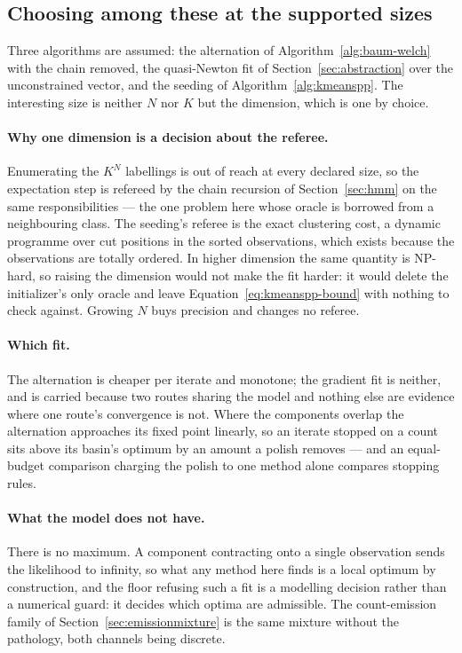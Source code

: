 \documentclass[11pt,a4paper]{article}
\begin{document}
\subsection{Choosing among these at the supported sizes}
\label{sec:mixture:discussion}
Three algorithms are assumed: the alternation of
Algorithm~\ref{alg:baum-welch} with the chain removed, the quasi-Newton fit of
Section~\ref{sec:abstraction} over the unconstrained vector, and the seeding of
Algorithm~\ref{alg:kmeanspp}. The interesting size is neither $N$ nor $K$ but
the dimension, which is one by choice.

\paragraph{Why one dimension is a decision about the referee.}
Enumerating the $K^N$ labellings is out of reach at every declared size, so the
expectation step is refereed by the chain recursion of Section~\ref{sec:hmm} on
the same responsibilities --- the one problem here whose oracle is borrowed
from a neighbouring class. The seeding's referee is the exact clustering cost,
a dynamic programme over cut positions in the sorted observations, which exists
because the observations are totally ordered. In higher dimension the same
quantity is NP-hard, so raising the dimension would not make the fit harder: it
would delete the initializer's only oracle and leave
Equation~\ref{eq:kmeanspp-bound} with nothing to check against. Growing $N$
buys precision and changes no referee.

\paragraph{Which fit.}
The alternation is cheaper per iterate and monotone; the gradient fit is
neither, and is carried because two routes sharing the model and nothing else
are evidence where one route's convergence is not. Where the components overlap
the alternation approaches its fixed point linearly, so an iterate stopped on a
count sits above its basin's optimum by an amount a polish removes --- and an
equal-budget comparison charging the polish to one method alone compares
stopping rules.

\paragraph{What the model does not have.}
There is no maximum. A component contracting onto a single observation sends
the likelihood to infinity, so what any method here finds is a local optimum by
construction, and the floor refusing such a fit is a modelling decision rather
than a numerical guard: it decides which optima are admissible. The
count-emission family of Section~\ref{sec:emissionmixture} is the same mixture
without the pathology, both channels being discrete.
\end{document}
